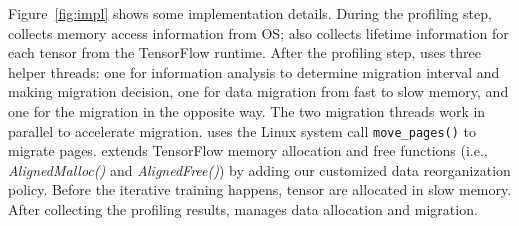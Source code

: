 

Figure~\ref{fig:impl} shows some implementation details. \textcolor{check}{During the profiling step, \name collects memory access information from OS; \name also collects lifetime information for each tensor from the TensorFlow runtime. After the profiling step,}  \name uses three helper threads: one for information analysis to determine migration interval and making migration decision, one for data migration from fast to slow memory, and one for the migration in the opposite way. The two migration threads work in parallel to accelerate migration. \name uses the Linux system call \texttt{move\_pages()} to migrate pages. \textcolor{check}{
\name extends TensorFlow memory allocation and free functions (i.e., \textit{AlignedMalloc()} and \textit{AlignedFree()}) by adding our customized data reorganization policy. Before the iterative training happens, tensor are allocated in slow memory. After collecting the profiling results, \name manages data allocation and migration.}


